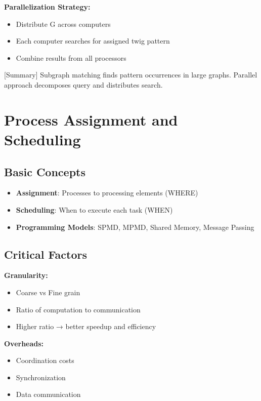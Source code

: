 \documentclass[12pt]{article}
\begin{document}
\textbf{Parallelization Strategy:}
\begin{itemize}
    \item Distribute G across computers
    \item Each computer searches for assigned twig pattern
    \item Combine results from all processors
\end{itemize}

[Summary] Subgraph matching finds pattern occurrences in large graphs. Parallel approach decomposes query and distributes search.

\section{Process Assignment and Scheduling}

\subsection{Basic Concepts}

\begin{itemize}
    \item \textbf{Assignment}: Processes to processing elements (WHERE)
    \item \textbf{Scheduling}: When to execute each task (WHEN)
    \item \textbf{Programming Models}: SPMD, MPMD, Shared Memory, Message Passing
\end{itemize}

\subsection{Critical Factors}

\textbf{Granularity:}
\begin{itemize}
    \item Coarse vs Fine grain
    \item Ratio of computation to communication
    \item Higher ratio → better speedup and efficiency
\end{itemize}

\textbf{Overheads:}
\begin{itemize}
    \item Coordination costs
    \item Synchronization
    \item Data communication
\end{itemize}
\end{document}
